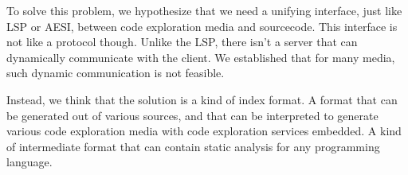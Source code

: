 To solve this problem, we hypothesize that we need a unifying interface, just like \ac{LSP} or \ac{AESI}, between code exploration media
and sourcecode.
This interface is not like a protocol though.
Unlike the \ac{LSP}, there isn't a server that can dynamically communicate with the client.
We established that for many media, such dynamic communication is not feasible.

Instead, we think that the solution is a kind of index format.
A format that can be generated out of various sources, and that can be interpreted to generate various code exploration media
with code exploration services embedded.
A kind of intermediate format that can contain static analysis for any programming language.


